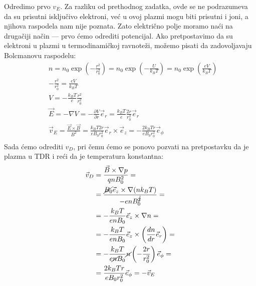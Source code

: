 \documentclass[fleqn]{report}
\begin{document}
\begin{enumerate}
          Odredimo prvo $v_E$.
          Za razliku od prethodnog zadatka, ovde se ne podrazumeva da su prisutni isključivo elektroni, već u ovoj plazmi mogu biti prisutni i joni, a njihova raspodela nam nije poznata.
          Zato električno polje moramo naći na drugačiji način --- prvo ćemo odrediti potencijal.
          Ako pretpostavimo da su elektroni u plazmi u termodinamičkoj ravnoteži, možemo pisati da zadovoljavaju Bolcmanovu raspodelu:
          \begin{align*}
               & n = n_0 \exp\left(-\frac{r^2}{r_0^2}\right) = n_0 \exp(-\frac{U}{k_B T}) = n_0 \exp(\frac{eV}{k_B T})                                              \\
               & -\frac{r^2}{r_0^2} = \frac{eV}{k_B T}                                                                                                              \\
               & V = -\frac{k_B T}{e}\frac{r^2}{r_0^2}                                                                                                              \\
               & \vec E = -\nabla V = -\frac{\partial V}{\partial r} \vec{e}_r = \frac{k_B T}{e} \frac{2r}{r_0^2} \vec{e}_r                                         \\
               & \vec{v}_E = \frac{\vec{E}\times\vec{B}}{B^2} = \frac{k_B T 2r}{e B_0 r_0^2} \vec{e}_r \times \vec{e}_z = -\frac{2k_B T r}{e B_0 r_0^2}\vec{e}_\phi \\
          \end{align*}
          Sada ćemo odrediti $v_D$, pri čemu ćemo se ponovo pozvati na pretpostavku da je plazma u TDR i reći da je temperatura konstantna:
          \begin{align*}
              \vec{v}_D & = \frac{\vec{B} \times \nabla p}{qnB_0^2} =                                              \\
                        & = \frac{\cancel{B_0} \vec{e}_z \times \nabla (n k_B T)}{-e n B_0^{\cancel 2}} =          \\
                        & = -\frac{k_B T}{e n B_0} \vec{e}_z \times \nabla n =                                     \\
                        & = -\frac{k_B T}{e n B_0} \vec{e}_z \times \left(\frac{dn}{dr} \vec{e}_r\right) =         \\
                        & = -\frac{k_B T}{e \cancel n B_0} \cancel n \left(-\frac{2r}{r_0^2}\right) \vec{e}_\phi = \\
                        & = \frac{2 k_B T r}{e B_0 r_0^2} \vec{e}_\phi = -\vec{v}_E
          \end{align*}


\end{enumerate}
\end{document}
